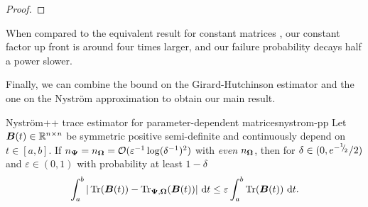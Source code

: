 \documentclass[12pt]{article}
\begin{document}
\begin{proof}
\end{proof}

When compared to the equivalent result for constant matrices \cite[Lemma 3.2]{persson-2022-improved-variants}, our constant factor up front is around four times larger, and our failure probability decays half a power slower.

Finally, we can combine the bound on the Girard-Hutchinson estimator  and the one on the Nyström approximation  to obtain our main result.

\begin{theorem}{Nyström++ trace estimator for parameter-dependent matrices}{nystrom-pp}
    Let $\boldsymbol{B}(t) \in \mathbb{R}^{n \times n}$ be symmetric positive semi-definite and continuously depend on $t \in [a, b]$. If $n_{\boldsymbol{\Psi}} = n_{\boldsymbol{\Omega}} = \mathcal{O}(\varepsilon^{-1} \log(\delta^{-1})^2)$ with \emph{even} $n_{\boldsymbol{\Omega}}$, then for $\delta \in (0, e^{-{}^{1}{\mskip -5mu/\mskip -3mu}_{2}}/2)$ and $\varepsilon \in (0, 1)$ with probability at least $1 - \delta$
    \begin{equation}
        \int_{a}^{b} | \operatorname{Tr}(\boldsymbol{B}(t)) - \operatorname{Tr}_{\boldsymbol{\Psi}, \boldsymbol{\Omega}}(\boldsymbol{B}(t)) |~\mathrm{d}t
        \leq \varepsilon \int_{a}^{b} \operatorname{Tr}(\boldsymbol{B}(t))~\mathrm{d}t.
    \end{equation}
\end{theorem}
\end{document}
